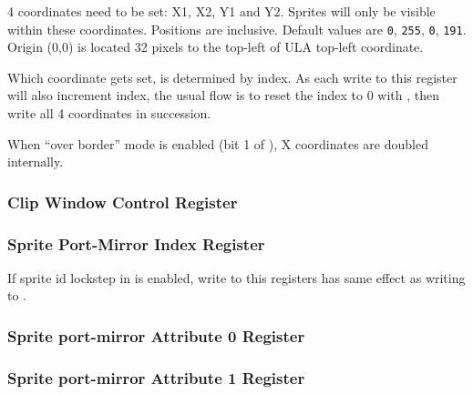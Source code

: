 4 coordinates need to be set: X1, X2, Y1 and Y2. Sprites will only be visible within these coordinates. Positions are inclusive. Default values are {\tt 0}, {\tt 255}, {\tt 0}, {\tt 191}. Origin (0,0) is located 32 pixels to the top-left of ULA top-left coordinate.

Which coordinate gets set, is determined by index. As each write to this register will also increment index, the usual flow is to reset the index to 0 with , then write all 4 coordinates in succession.

When ``over border'' mode is enabled (bit 1 of ), X coordinates are doubled internally.


\subsubsection{Clip Window Control Register }



\subsubsection{Sprite Port-Mirror Index Register }

If sprite id lockstep in  is enabled, write to this registers has same effect as writing to .

\begin{NextPort}
\end{NextPort}


\subsubsection{Sprite port-mirror Attribute 0 Register }

\begin{NextPort}
\end{NextPort}


\subsubsection{Sprite port-mirror Attribute 1 Register }


